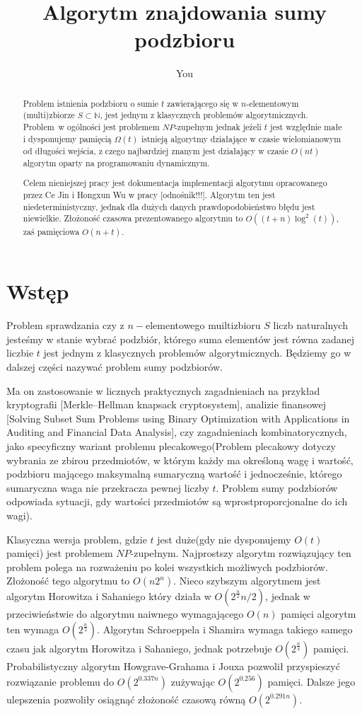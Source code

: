 \documentclass{article}
\title{Algorytm znajdowania sumy podzbioru}
\author{You}
\begin{document}
\maketitle

\begin{abstract}
Problem istnienia podzbioru o sumie $t$ zawierającego się w $n$-elementowym (multi)zbiorze $S \subset \mathbb{N}$, 
jest jednym z klasycznych problemów algorytmicznych. Problem w ogólności jest problemem $NP$-zupełnym
jednak jeżeli $t$ jest względnie małe i dysponujemy pamięcią $\Omega(t)$ istnieją algorytmy działające 
w czasie wielomianowym od długości wejścia, z czego najbardziej znanym jest działający w czasie $O(nt)$
algorytm oparty na programowaniu dynamicznym.

Celem nieniejszej pracy jest dokumentacja implementacji
algorytmu opracowanego przez Ce Jin i Hongxun Wu w pracy [odnośnik!!!]. Algorytm ten jest niedeterministyczny,
jednak dla dużych danych prawdopodobieństwo błędu jest niewielkie. Złożoność czasowa prezentowanego
algorytmu to $O((t+n)\log^2(t))$, zaś pamięciowa $O(n+t)$.

\end{abstract}

\section{Wstęp}
Problem sprawdzania czy z $n-$elementowego muiltizbioru $S$ liczb naturalnych jesteśmy w stanie wybrać 
podzbiór, którego suma elementów jest równa zadanej liczbie $t$ jest jednym z klasycznych problemów 
algorytmicznych. Będziemy go w dalszej części nazywać problem sumy podzbiorów. 

Ma on zastosowanie w licznych praktycznych zagadnieniach na przykład kryptografii
[Merkle–Hellman knapsack cryptosystem], analizie finansowej 
[Solving Subset Sum Problems using Binary Optimization with 
Applications in Auditing and Financial Data Analysis], czy zagadnieniach kombinatorycznych, jako specyficzny
wariant problemu plecakowego(Problem plecakowy dotyczy wybrania ze zbirou przedmiotów, w którym każdy ma 
określoną wagę i wartość, podzbioru mającego maksymalną sumaryczną wartość i jednocześnie, którego 
sumaryczna waga nie przekracza pewnej liczby $t$. Problem sumy podzbiorów odpowiada sytuacji, 
gdy wartości przedmiotów są wprostproporcjonalne do ich wagi). 

Klasyczna wersja problem, gdzie $t$ jest duże(gdy nie dysponujemy $O(t)$ pamięci) jest problemem 
$NP$-zupełnym. Najprostszy algorytm rozwiązujący ten problem polega na rozważeniu po kolei wszystkich 
możliwych podzbiorów. Złożoność tego algorytmu to $O(n2^n)$. Nieco szybszym algorytmem jest algorytm Horowitza
i Sahaniego który działa w $O(2^{\frac{n}{2}}n/2)$, jednak w przeciwieństwie do algorytmu naiwnego wymagającego
$O(n)$ pamięci algorytm ten wymaga $O(2^{\frac{n}{2}})$. Algorytm Schroeppela i Shamira wymaga takiego samego
czasu jak algorytm Horowitza i Sahaniego, jednak potrzebuje $O(2^{\frac{n}{4}})$ pamięci. Probabilistyczny 
algorytm Howgrave-Grahama i Jouxa pozwolił przyspieszyć rozwiązanie problemu do $O(2^{0.337n})$
zużywając $O(2^{0.256})$ pamięci. Dalsze jego ulepszenia pozwoliły osiągnąć złożoność czasową równą 
$O(2^{0.291n})$.
\end{document}
